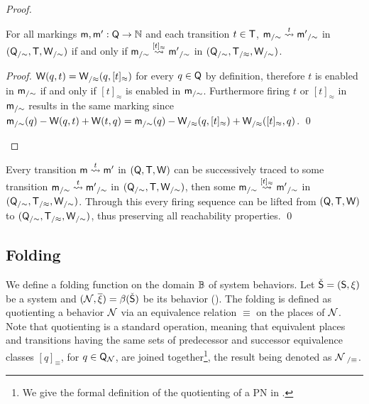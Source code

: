 \begin{textAtEnd}[category=quotients]
\begin{proof}
  \begin{fact}
    For all markings $\mathsf{m},\mathsf{m}' : \mathsf{Q}\rightarrow\mathbb{N}$ and each transition $t \in \mathsf{T}$,
    ${\mathsf{m}}_{/\sim} \stackrel{t}{\leadsto} {\mathsf{m}'}_{/\sim}$
    in $({\mathsf{Q}}_{/\sim},\mathsf{T},{\mathsf{W}}_{/\sim})$
    if and only if ${\mathsf{m}}_{/\sim} \stackrel{[t]_\approx}{\leadsto} {\mathsf{m}'}_{/\sim}$
    in $({\mathsf{Q}}_{/\sim},{\mathsf{T}}_{/\approx},{\mathsf{W}}_{/\sim})$.
  \end{fact}
  \begin{proof}
    $\mathsf{W}(q,t) = {\mathsf{W}}_{/\approx}(q,[t]_\approx)$
    for every $q \in \mathsf{Q}$ by definition,
    therefore $t$ is enabled in ${\mathsf{m}}_{/\sim}$ if and only if $[t]_\approx$
    is enabled in ${\mathsf{m}}_{/\sim}$.
    Furthermore firing $t$ or $[t]_\approx$ in ${\mathsf{m}}_{/\sim}$
    results in the same marking since
    ${\mathsf{m}}_{/\sim}(q) - \mathsf{W}(q,t) + \mathsf{W}(t,q)
      = {\mathsf{m}}_{/\sim}(q)
      - {\mathsf{W}}_{/\approx}(q,[t]_\approx)
      + {\mathsf{W}}_{/\approx}([t]_\approx,q)$.
    \qed
  \end{proof}
\end{proof}
\begin{proofSketch}
  Every transition $\mathsf{m} \stackrel{t}{\leadsto} \mathsf{m}'$ in $(\mathsf{Q},\mathsf{T},\mathsf{W})$
  can be successively traced to
  some transition ${\mathsf{m}}_{/\sim} \stackrel{t}{\leadsto} {\mathsf{m}'}_{/\sim}$
  in $({\mathsf{Q}}_{/\sim}, \mathsf{T}, {\mathsf{W}}_{/\sim})$,
  then some ${\mathsf{m}}_{/\sim} \stackrel{[t]_\approx}{\leadsto} {\mathsf{m}'}_{/\sim}$
  in $({\mathsf{Q}}_{/\sim},{\mathsf{T}}_{/\approx},{\mathsf{W}}_{/\sim})$.
  Through this every firing sequence can be lifted from $(\mathsf{Q},\mathsf{T},\mathsf{W})$
  to $({\mathsf{Q}}_{/\sim},{\mathsf{T}}_{/\approx},{\mathsf{W}}_{/\sim})$,
  thus preserving all reachability properties.
  \qed
\end{proofSketch}
\ifLongVersion\else
\end{textAtEnd}
\fi

\subsection{Folding}

We define a folding function on the domain $\mathbb{B}$ of system
behaviors. Let $\check{\mathsf{S}} = (\mathsf{S},\xi)$ be a system and
$(\mathcal{N},\overline{\xi}) = \beta({\check{\mathsf{S}}})$ be its
behavior (). \ifLongVersion\else The folding is
defined as quotienting a behavior $\mathcal{N}$ via an equivalence
relation $\equiv$ on the places of $\mathcal{N}$. Note that quotienting is a
standard operation, meaning that equivalent places and transitions
having the same sets of predecessor and successor equivalence classes
$[q]_{\equiv}$, for $q \in \mathsf{Q}_{\mathcal{N}}$, are joined
together\footnote{We give the formal definition of the quotienting of
  a PN in .}, the result being denoted as
$\mathcal{N}_{~/\equiv}$. \fi

